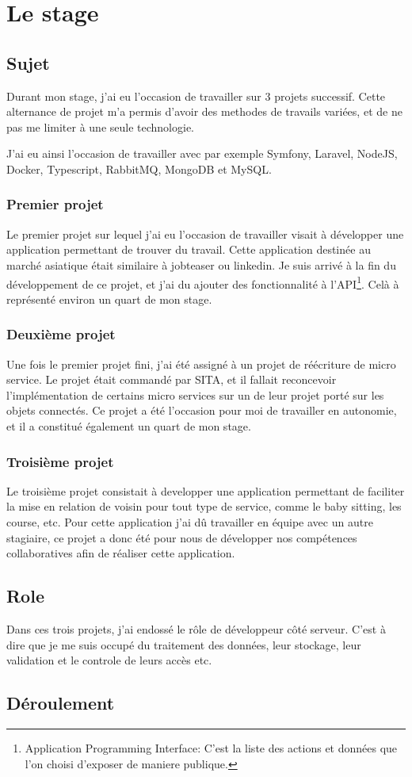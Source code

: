 \documentclass[../rapport.tex]{subfiles}
\begin{document}
    \chapter{Le stage}
    \section{Sujet}
        Durant mon stage, j'ai eu l'occasion de travailler sur 3 projets successif.
        Cette alternance de projet m'a permis d'avoir des methodes de travails variées,
        et de ne pas me limiter à une seule technologie.

        J'ai eu ainsi l'occasion de travailler avec par exemple Symfony,
        Laravel, NodeJS, Docker, Typescript, RabbitMQ, MongoDB et MySQL.

        \subsection{Premier projet}
        Le premier projet sur lequel j'ai eu l'occasion de travailler visait à
        développer une application permettant de trouver du travail. Cette
        application destinée au marché asiatique était similaire à jobteaser ou
        linkedin. Je suis arrivé à la fin du développement de ce projet, et j'ai du 
        ajouter des fonctionnalité à l'API\footnote{Application Programming
        Interface: C'est la liste des actions et données que l'on choisi
        d'exposer de maniere publique.}. Celà à représenté environ un quart de mon
        stage.

        \subsection{Deuxième projet}
        Une fois le premier projet fini, j'ai été assigné à un projet de
        réécriture de micro service. 
        Le projet était commandé par SITA, et il fallait reconcevoir l'implémentation
        de certains micro services sur un de leur projet porté sur les objets
        connectés.
        Ce projet a été l'occasion pour moi de travailler en autonomie, et il a
        constitué également un quart de mon stage.

        \subsection{Troisième projet}
        Le troisième projet consistait à developper une application permettant
        de faciliter la mise en relation de voisin pour tout type de service, comme
        le baby sitting, les course, etc. Pour cette application j'ai dû travailler en
        équipe avec un autre stagiaire, ce projet a donc été pour nous de développer 
        nos compétences collaboratives afin de réaliser cette application.
    \section{Role}
        Dans ces trois projets, j'ai endossé le rôle de développeur côté serveur. C'est à dire que je me suis occupé du traitement des données, leur stockage, leur validation et le controle de leurs accès etc.
    \section{Déroulement}
\end{document}
